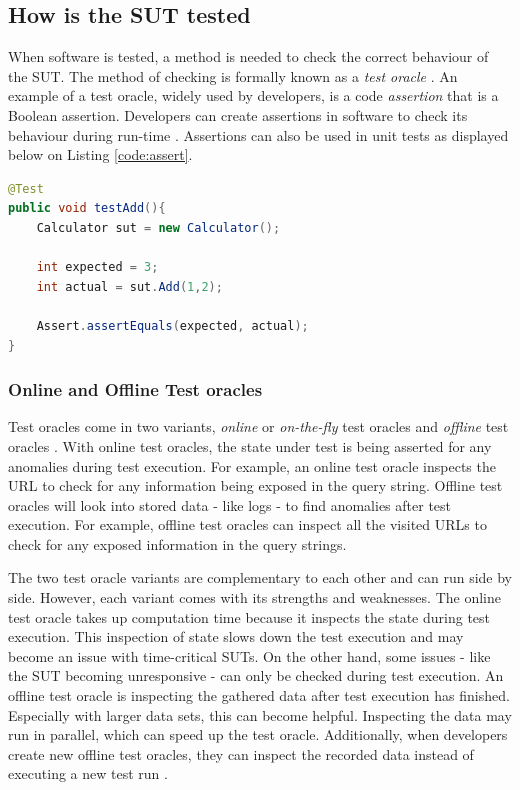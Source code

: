 \subsection{How is the SUT tested} \label{test-oracles}
When software is tested, a method is needed to check the correct behaviour of the SUT. The method of checking is formally known as a \emph{test oracle} \cite{testOracles}. An example of a test oracle, widely used by developers, is a code \emph{assertion} that is a Boolean assertion. Developers can create assertions in software to check its behaviour during run-time \cite{barr2014oracle}. Assertions can also be used in unit tests as displayed below on Listing \ref{code:assert}. 

\begin{lstlisting}[language=Java, caption=Example assertion, label=code:assert]
@Test
public void testAdd(){
    Calculator sut = new Calculator();

    int expected = 3;
    int actual = sut.Add(1,2);

    Assert.assertEquals(expected, actual);
}
\end{lstlisting}

\subsubsection{Online and Offline Test oracles}
Test oracles come in two variants, \emph{online} or \emph{on-the-fly} test oracles and \emph{offline} test oracles \cite{VosAho2021}. With online test oracles, the state under test is being asserted for any anomalies during test execution. For example,  an online test oracle inspects the URL to check for any information being exposed in the query string. Offline test oracles will look into stored data - like logs - to find anomalies after test execution. For example, offline test oracles can inspect all the visited URLs to check for any exposed information in the query strings.

The two test oracle variants are complementary to each other and can run side by side. However, each variant comes with its strengths and weaknesses. The online test oracle takes up computation time because it inspects the state during test execution. This inspection of state slows down the test execution and may become an issue with time-critical SUTs. On the other hand, some issues - like the SUT becoming unresponsive - can only be checked during test execution. An offline test oracle is inspecting the gathered data after test execution has finished. Especially with larger data sets, this can become helpful. Inspecting the data may run in parallel, which can speed up the test oracle. Additionally, when developers create new offline test oracles, they can inspect the recorded data instead of executing a new test run \cite{de2019offline}.

